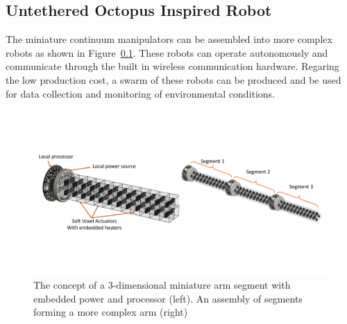 \subsection{Untethered Octopus Inspired Robot}
The miniature continuum manipulators can be assembled into more complex robots as shown in Figure~\ref{}. These robots can operate autonomously and communicate through the built in wireless communication hardware. Regaring the low production cost, a swarm of these robots can be produced and be used for data collection and monitoring of environmental conditions. 
\begin{figure}[!t]
\centering
\includegraphics[width=\textwidth]{3Darm.pdf}
    \caption[3-dimensional miniature arm]{The concept of a 3-dimensional miniature arm segment with embedded power and processor (left). An assembly of segments forming a more complex arm (right)}
    \label{fig:3Darm}
\end{figure}
